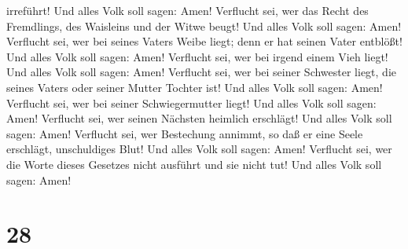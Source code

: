 irreführt! Und alles Volk soll sagen: Amen!  Verflucht
sei, wer das Recht des Fremdlings, des Waisleins und der Witwe beugt!
Und alles Volk soll sagen: Amen!  Verflucht sei, wer bei
seines Vaters Weibe liegt; denn er hat seinen Vater entblößt! Und alles
Volk soll sagen: Amen!  Verflucht sei, wer bei irgend
einem Vieh liegt! Und alles Volk soll sagen: Amen! 
Verflucht sei, wer bei seiner Schwester liegt, die seines Vaters oder
seiner Mutter Tochter ist! Und alles Volk soll sagen: Amen!
 Verflucht sei, wer bei seiner Schwiegermutter liegt! Und
alles Volk soll sagen: Amen!  Verflucht sei, wer seinen
Nächsten heimlich erschlägt! Und alles Volk soll sagen: Amen!
 Verflucht sei, wer Bestechung annimmt, so daß er eine
Seele erschlägt, unschuldiges Blut! Und alles Volk soll sagen: Amen!
 Verflucht sei, wer die Worte dieses Gesetzes nicht
ausführt und sie nicht tut! Und alles Volk soll sagen: Amen!

\hypertarget{section-27}{%
\section{28}\label{section-27}}

